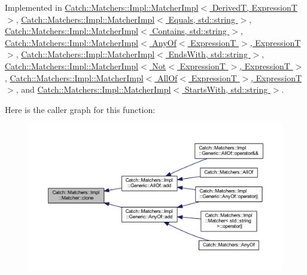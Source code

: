 Implemented in \hyperlink{struct_catch_1_1_matchers_1_1_impl_1_1_matcher_impl_af7cf4b7b730145d4455dc356490e6b77}{Catch\+::\+Matchers\+::\+Impl\+::\+Matcher\+Impl$<$ Derived\+T, Expression\+T $>$}, \hyperlink{struct_catch_1_1_matchers_1_1_impl_1_1_matcher_impl_af7cf4b7b730145d4455dc356490e6b77}{Catch\+::\+Matchers\+::\+Impl\+::\+Matcher\+Impl$<$ Equals, std\+::string $>$}, \hyperlink{struct_catch_1_1_matchers_1_1_impl_1_1_matcher_impl_af7cf4b7b730145d4455dc356490e6b77}{Catch\+::\+Matchers\+::\+Impl\+::\+Matcher\+Impl$<$ Contains, std\+::string $>$}, \hyperlink{struct_catch_1_1_matchers_1_1_impl_1_1_matcher_impl_af7cf4b7b730145d4455dc356490e6b77}{Catch\+::\+Matchers\+::\+Impl\+::\+Matcher\+Impl$<$ Any\+Of$<$ Expression\+T $>$, Expression\+T $>$}, \hyperlink{struct_catch_1_1_matchers_1_1_impl_1_1_matcher_impl_af7cf4b7b730145d4455dc356490e6b77}{Catch\+::\+Matchers\+::\+Impl\+::\+Matcher\+Impl$<$ Ends\+With, std\+::string $>$}, \hyperlink{struct_catch_1_1_matchers_1_1_impl_1_1_matcher_impl_af7cf4b7b730145d4455dc356490e6b77}{Catch\+::\+Matchers\+::\+Impl\+::\+Matcher\+Impl$<$ Not$<$ Expression\+T $>$, Expression\+T $>$}, \hyperlink{struct_catch_1_1_matchers_1_1_impl_1_1_matcher_impl_af7cf4b7b730145d4455dc356490e6b77}{Catch\+::\+Matchers\+::\+Impl\+::\+Matcher\+Impl$<$ All\+Of$<$ Expression\+T $>$, Expression\+T $>$}, and \hyperlink{struct_catch_1_1_matchers_1_1_impl_1_1_matcher_impl_af7cf4b7b730145d4455dc356490e6b77}{Catch\+::\+Matchers\+::\+Impl\+::\+Matcher\+Impl$<$ Starts\+With, std\+::string $>$}.

Here is the caller graph for this function\+:\nopagebreak
\begin{figure}[H]
\begin{center}
\leavevmode
\includegraphics[width=350pt]{struct_catch_1_1_matchers_1_1_impl_1_1_matcher_a9d31e5018fea24efa08c3cbf5aa4475d_icgraph}
\end{center}
\end{figure}
\hypertarget{struct_catch_1_1_matchers_1_1_impl_1_1_matcher_a8c1c5511ce1f3738a45e6901b558f583}{}\label{struct_catch_1_1_matchers_1_1_impl_1_1_matcher_a8c1c5511ce1f3738a45e6901b558f583} 
